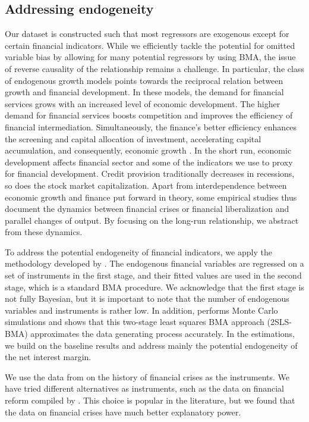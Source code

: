 \begin{refsection}
\subsection{Addressing endogeneity}\label{ch2subsec:endog}
Our dataset is constructed such that most regressors are exogenous except for certain financial indicators. While we efficiently tackle the potential for omitted variable bias by allowing for many potential regressors by using \ac{BMA}, the issue of reverse causality of the relationship remains a challenge. In particular, the class of endogenous growth models points towards the reciprocal relation between growth and financial development. In these models, the demand for financial services grows with an increased level of economic development. The higher demand for financial services boosts competition and improves the efficiency of financial intermediation. Simultaneously, the finance's better efficiency enhances the screening and capital allocation of investment, accelerating capital accumulation, and consequently, economic growth \parencite{Ang2008}. In the short run, economic development affects financial sector and some of the indicators we use to proxy for financial development. Credit provision traditionally decreases in recessions, so does the stock market capitalization. Apart from interdependence between economic growth and finance put forward in theory, some empirical studies thus document the dynamics between financial crises  \parencite{cerra2008growth,DellAricciaetal2008} or financial liberalization \parencite{Ranciereetal2006} and parallel changes of output. By focusing on the long-run relationship, we abstract from these dynamics.

To address the potential endogeneity of financial indicators, we apply the methodology developed by \textcite{Durlaufetal2008}. The endogenous financial variables are regressed on a set of instruments in the first stage, and their fitted values are used in the second stage, which is a standard BMA procedure. We acknowledge that the first stage is not fully Bayesian, but it is important to note that the number of endogenous variables and instruments is rather low. In addition, \textcite{Durlaufetal2008} performs Monte Carlo simulations and shows that this two-stage least squares BMA approach (2SLS-BMA) approximates the data generating process accurately. In the estimations, we build on the baseline results and address mainly the potential endogeneity of the net interest margin. 

We use the data from \textcite{ReinhartRogoff2008} on the history of financial crises as the instruments. We have tried different alternatives as instruments, such as the data on financial reform compiled by \textcite{Abiadetal2008}. This choice is popular in the literature, but we found that the data on financial crises have much better explanatory power.


\end{refsection}
